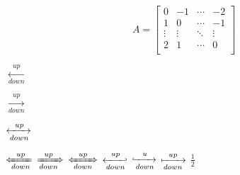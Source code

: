 \documentclass[letterpaper, onecolumn, twoside]{article}
\begin{document}
\begin{equation}
A = \begin{bmatrix}
0 & -1 & \cdots & -2 \\
1 & 0 & \cdots & -1 \\
\vdots & \vdots &  \ddots & \vdots \\ 
2 & 1 & \cdots &0 \\
\end{bmatrix}
\end{equation}

$ \xleftarrow[down]{up} $

$ \xrightarrow[down]{up} $

$ \xleftrightarrow[down]{up} $

$ \xLeftarrow[down]{up} $
$ \xRightarrow[down]{up} $
$ \xLeftrightarrow[down]{up} $
$ \xhookleftarrow[down]{up} $
$ \xhookrightarrow[down]{u} $
$ \xmapsto[down]{up} $
$ \frac{1}{2} $
\end{document}
